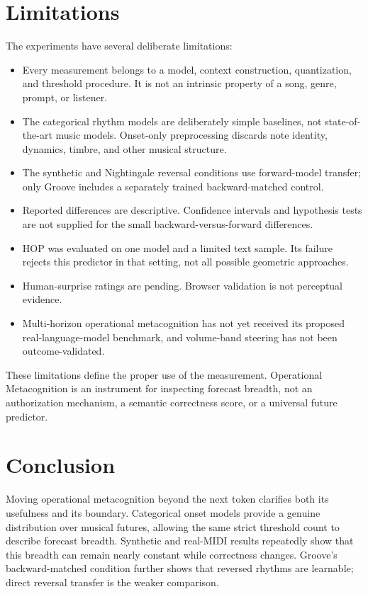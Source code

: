 \documentclass[11pt,a4paper]{article}
\begin{document}
\section{Limitations}
The experiments have several deliberate limitations:
\begin{itemize}[nosep]
  \item Every measurement belongs to a model, context construction, quantization, and threshold procedure. It is not an intrinsic property of a song, genre, prompt, or listener.
  \item The categorical rhythm models are deliberately simple baselines, not state-of-the-art music models. Onset-only preprocessing discards note identity, dynamics, timbre, and other musical structure.
  \item The synthetic and Nightingale reversal conditions use forward-model transfer; only Groove includes a separately trained backward-matched control.
  \item Reported differences are descriptive. Confidence intervals and hypothesis tests are not supplied for the small backward-versus-forward differences.
  \item HOP was evaluated on one model and a limited text sample. Its failure rejects this predictor in that setting, not all possible geometric approaches.
  \item Human-surprise ratings are pending. Browser validation is not perceptual evidence.
  \item Multi-horizon operational metacognition has not yet received its proposed real-language-model benchmark, and volume-band steering has not been outcome-validated.
\end{itemize}
These limitations define the proper use of the measurement. Operational Metacognition is an instrument for inspecting forecast breadth, not an authorization mechanism, a semantic correctness score, or a universal future predictor.

\section{Conclusion}
Moving operational metacognition beyond the next token clarifies both its usefulness and its boundary. Categorical onset models provide a genuine distribution over musical futures, allowing the same strict threshold count to describe forecast breadth. Synthetic and real-MIDI results repeatedly show that this breadth can remain nearly constant while correctness changes. Groove's backward-matched condition further shows that reversed rhythms are learnable; direct reversal transfer is the weaker comparison.
\end{document}
